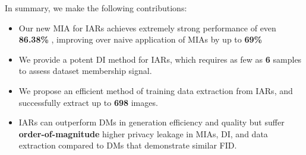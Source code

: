In summary, we make the following contributions: %
\begin{itemize}[itemsep=0pt, topsep=0pt]
    \item Our new MIA for IARs achieves extremely strong performance of even \textbf{86.38\%} \tprat, improving over naive application of MIAs by up to \textbf{69\%} %
    \item We provide a potent DI method for IARs, which requires as few as \textbf{6} samples to assess dataset membership signal. 
    \item We propose an efficient method of training data extraction from IARs, and successfully extract up to \textbf{698} images.
    \item  IARs can outperform DMs in generation efficiency and quality but suffer \textbf{order-of-magnitude} higher privacy leakage in MIAs, DI, and data extraction compared to DMs that demonstrate similar FID.
\end{itemize}













